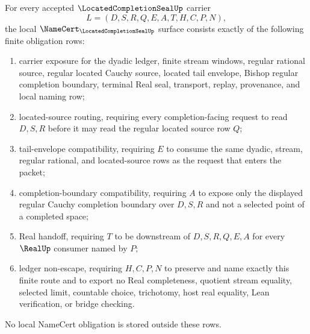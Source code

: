 \begin{theorem}
\label{thm:located-completion-seal-namecert-obligations}
For every accepted $\LocatedCompletionSealUp$ carrier
$$
L=(D,S,R,Q,E,A,T,H,C,P,N),
$$
the local $\NameCert_{\LocatedCompletionSealUp}$ surface consists exactly of the following finite obligation rows:
\begin{enumerate}
\item carrier exposure for the dyadic ledger, finite stream windows, regular rational source, regular located Cauchy source, located tail envelope, Bishop regular completion boundary, terminal Real seal, transport, replay, provenance, and local naming row;
\item located-source routing, requiring every completion-facing request to read $D,S,R$ before it may read the regular located source row $Q$;
\item tail-envelope compatibility, requiring $E$ to consume the same dyadic, stream, regular rational, and located-source rows as the request that enters the packet;
\item completion-boundary compatibility, requiring $A$ to expose only the displayed regular Cauchy completion boundary over $D,S,R$ and not a selected point of a completed space;
\item Real handoff, requiring $T$ to be downstream of $D,S,R,Q,E,A$ for every $\RealUp$ consumer named by $P$;
\item ledger non-escape, requiring $H,C,P,N$ to preserve and name exactly this finite route and to export no Real completeness, quotient stream equality, selected limit, countable choice, trichotomy, host real equality, Lean verification, or bridge checking.
\end{enumerate}
No local NameCert obligation is stored outside these rows.
\end{theorem}
